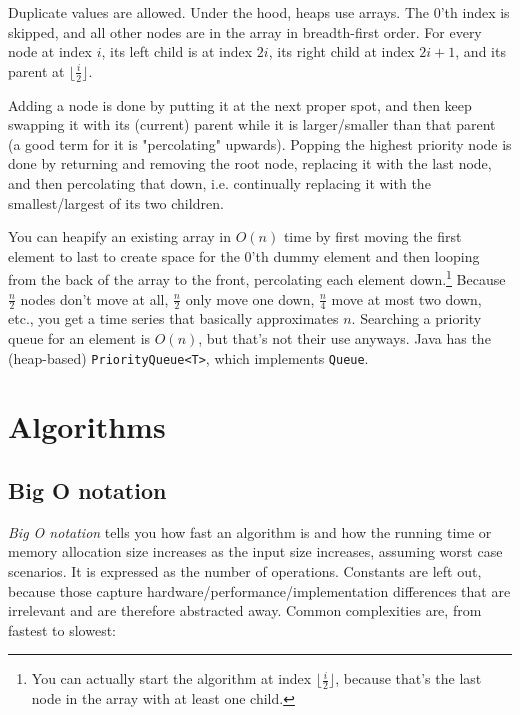 \documentclass[8pt, table, xcdraw]{article}%
\begin{document}
Duplicate values are allowed. Under the hood, heaps use arrays. The $0$'th index is skipped, and all other nodes are in the array in breadth-first order. For every node at index $i$, its left child is at index $2i$, its right child at index $2i+1$, and its parent at $\lfloor \frac{i}{2}\rfloor$.

Adding a node is done by putting it at the next proper spot, and then keep swapping it with its (current) parent while it is larger/smaller than that parent (a good term for it is "percolating" upwards). Popping the highest priority node is done by returning and removing the root node, replacing it with the last node, and then percolating that down, i.e. continually replacing it with the smallest/largest of its two children.

You can heapify an existing array in $O(n)$ time by first moving the first element to last to create space for the 0'th dummy element and then looping from the back of the array to the front, percolating each element down.\footnote{You can actually start the algorithm at index $\lfloor \frac{i}{2}\rfloor$, because that's the last node in the array with at least one child.} Because $\frac{n}{2}$ nodes don't move at all, $\frac{n}{2}$ only move one down, $\frac{n}{4}$ move at most two down, etc., you get a time series that basically approximates $n$.
Searching a priority queue for an element is $O(n)$, but that's not their use anyways. Java has the (heap-based) \lstinline{PriorityQueue<T>}, which implements \lstinline{Queue}.

\section{Algorithms}

\subsection{Big O notation}

\emph{Big O notation} tells you how fast an algorithm is and how the running time or memory allocation size increases as the input size increases, assuming worst case scenarios. It is expressed as the number of operations. Constants are left out, because those capture hardware/performance/implementation differences that are irrelevant and are therefore abstracted away. Common complexities are, from fastest to slowest:
\end{document}
